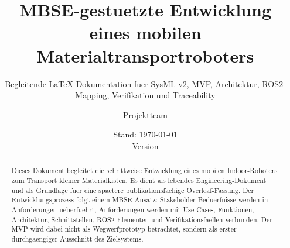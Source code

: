 \documentclass[11pt,a4paper,oneside]{scrreprt}
\title{MBSE-gestuetzte Entwicklung eines mobilen Materialtransportroboters}
\subtitle{Begleitende LaTeX-Dokumentation fuer SysML v2, MVP, Architektur, ROS2-Mapping, Verifikation und Traceability}
\author{Projektteam}
\date{Stand: \today \\ Version \projectversion}
\begin{document}
\maketitle

\begin{abstract}
Dieses Dokument begleitet die schrittweise Entwicklung eines mobilen Indoor-Roboters zum Transport kleiner Materialkisten. Es dient als lebendes Engineering-Dokument und als Grundlage fuer eine spaetere publikationsfaehige Overleaf-Fassung. Der Entwicklungsprozess folgt einem MBSE-Ansatz: Stakeholder-Beduerfnisse werden in Anforderungen ueberfuehrt, Anforderungen werden mit Use Cases, Funktionen, Architektur, Schnittstellen, ROS2-Elementen und Verifikationsfaellen verbunden. Der MVP wird dabei nicht als Wegwerfprototyp betrachtet, sondern als erster durchgaengiger Ausschnitt des Zielsystems.
\end{abstract}

\tableofcontents
\listoffigures
\listoftables
\clearpage
{}















\appendix




\printbibliography
\end{document}
